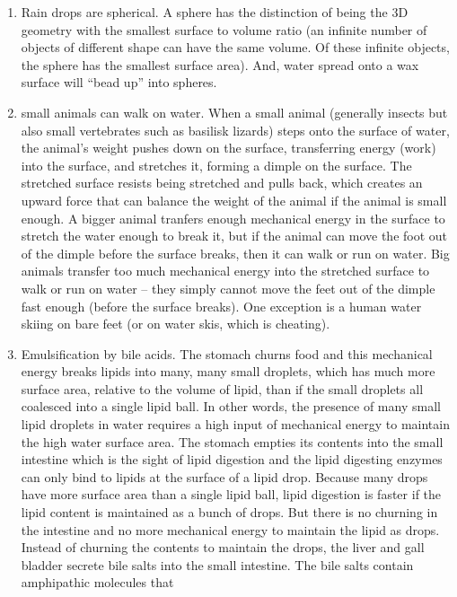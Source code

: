 \documentclass[]{book}
\begin{document}
\begin{enumerate}
\def\labelenumi{\arabic{enumi}.}
\item
  Rain drops are spherical. A sphere has the distinction of being the 3D
  geometry with the smallest surface to volume ratio (an infinite number
  of objects of different shape can have the same volume. Of these
  infinite objects, the sphere has the smallest surface area). And,
  water spread onto a wax surface will ``bead up'' into spheres.
\item
  small animals can walk on water. When a small animal (generally
  insects but also small vertebrates such as basilisk lizards) steps
  onto the surface of water, the animal's weight pushes down on the
  surface, transferring energy (work) into the surface, and stretches
  it, forming a dimple on the surface. The stretched surface resists
  being stretched and pulls back, which creates an upward force that can
  balance the weight of the animal if the animal is small enough. A
  bigger animal tranfers enough mechanical energy in the surface to
  stretch the water enough to break it, but if the animal can move the
  foot out of the dimple before the surface breaks, then it can walk or
  run on water. Big animals transfer too much mechanical energy into the
  stretched surface to walk or run on water -- they simply cannot move
  the feet out of the dimple fast enough (before the surface breaks).
  One exception is a human water skiing on bare feet (or on water skis,
  which is cheating).
\item
  Emulsification by bile acids. The stomach churns food and this
  mechanical energy breaks lipids into many, many small droplets, which
  has much more surface area, relative to the volume of lipid, than if
  the small droplets all coalesced into a single lipid ball. In other
  words, the presence of many small lipid droplets in water requires a
  high input of mechanical energy to maintain the high water surface
  area. The stomach empties its contents into the small intestine which
  is the sight of lipid digestion and the lipid digesting enzymes can
  only bind to lipids at the surface of a lipid drop. Because many drops
  have more surface area than a single lipid ball, lipid digestion is
  faster if the lipid content is maintained as a bunch of drops. But
  there is no churning in the intestine and no more mechanical energy to
  maintain the lipid as drops. Instead of churning the contents to
  maintain the drops, the liver and gall bladder secrete bile salts into
  the small intestine. The bile salts contain amphipathic molecules that

\end{enumerate}
\end{document}
